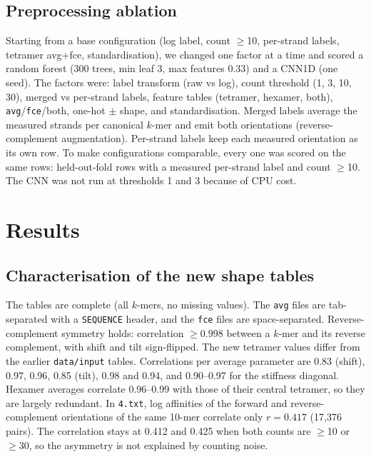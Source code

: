 \documentclass[11pt,a4paper]{article}
\begin{document}
\subsection{Preprocessing ablation}
Starting from a base configuration (log label, count $\geq$10, per-strand labels, tetramer avg+fce, standardisation), we changed one factor at a time and scored a random forest (300 trees, min leaf 3, max features 0.33) and a CNN1D (one seed). The factors were: label transform (raw vs log), count threshold (1, 3, 10, 30), merged vs per-strand labels, feature tables (tetramer, hexamer, both), \texttt{avg}/\texttt{fce}/both, one-hot $\pm$ shape, and standardisation. Merged labels average the measured strands per canonical $k$-mer and emit both orientations (reverse-complement augmentation). Per-strand labels keep each measured orientation as its own row. To make configurations comparable, every one was scored on the same rows: held-out-fold rows with a measured per-strand label and count $\geq$10. The CNN was not run at thresholds 1 and 3 because of CPU cost.




\section{Results}
\subsection{Characterisation of the new shape tables}
The tables are complete (all $k$-mers, no missing values). The \texttt{avg} files are tab-separated with a \texttt{SEQUENCE} header, and the \texttt{fce} files are space-separated. Reverse-complement symmetry holds: correlation $\geq0.998$ between a $k$-mer and its reverse complement, with shift and tilt sign-flipped. The new tetramer values differ from the earlier \texttt{data/input} tables. Correlations per average parameter are 0.83 (shift), 0.97, 0.96, 0.85 (tilt), 0.98 and 0.94, and 0.90--0.97 for the stiffness diagonal. Hexamer averages correlate 0.96--0.99 with those of their central tetramer, so they are largely redundant. In \texttt{4.txt}, log affinities of the forward and reverse-complement orientations of the same 10-mer correlate only $r=0.417$ (17{,}376 pairs). The correlation stays at 0.412 and 0.425 when both counts are $\geq$10 or $\geq$30, so the asymmetry is not explained by counting noise.
\end{document}
